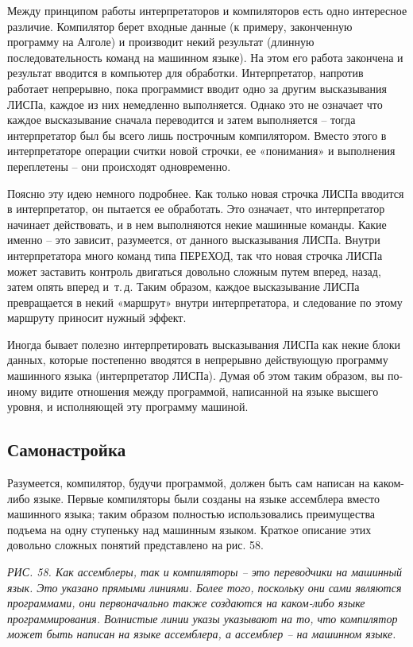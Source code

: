 \documentclass[../main.tex]{subfiles}
\begin{document}
Между принципом работы интерпретаторов и компиляторов есть одно интересное различие. Компилятор берет входные данные (к примеру, законченную программу на Алголе) и производит некий результат (длинную последовательность команд на машинном языке). На этом его работа закончена и результат вводится в компьютер для обработки. Интерпретатор, напротив работает непрерывно, пока программист вводит одно за другим высказывания ЛИСПа, каждое из них немедленно выполняется. Однако это не означает что каждое высказывание сначала переводится и затем выполняется \--- тогда интерпретатор был бы всего лишь построчным компилятором. Вместо этого в интерпретаторе операции считки новой строчки, ее «понимания» и выполнения переплетены \--- они происходят одновременно.

Поясню эту идею немного подробнее. Как только новая строчка ЛИСПа вводится в интерпретатор, он пытается ее обработать. Это означает, что интерпретатор начинает действовать, и в нем выполняются некие машинные команды. Какие именно \--- это зависит, разумеется, от данного высказывания ЛИСПа. Внутри интерпретатора много команд типа ПЕРЕХОД, так что новая строчка ЛИСПа может заставить контроль двигаться довольно сложным путем вперед, назад, затем опять вперед и~т.\,д. Таким образом, каждое высказывание ЛИСПа превращается в некий «маршрут» внутри интерпретатора, и следование по этому маршруту приносит нужный эффект.

Иногда бывает полезно интерпретировать высказывания ЛИСПа как некие блоки данных, которые постепенно вводятся в непрерывно действующую программу машинного языка (интерпретатор ЛИСПа). Думая об этом таким образом, вы по-иному видите отношения между программой, написанной на языке высшего уровня, и исполняющей эту программу машиной.


\subsection{Самонастройка}

Разумеется, компилятор, будучи программой, должен быть сам написан на каком-либо языке. Первые компиляторы были созданы на языке ассемблера вместо машинного языка; таким образом полностью использовались преимущества подъема на одну ступеньку над машинным языком. Краткое описание этих довольно сложных понятий представлено на рис. 58.

\emph{РИС. 58. Как ассемблеры, так и компиляторы \--- это переводчики на машинный язык. Это указано прямыми линиями. Более того, поскольку они сами являются программами, они первоначально также создаются на каком-либо языке программирования. Волнистые линии указы указывают на то, что компилятор может быть написан на языке ассемблера, а ассемблер \--- на машинном языке.}
\end{document}

